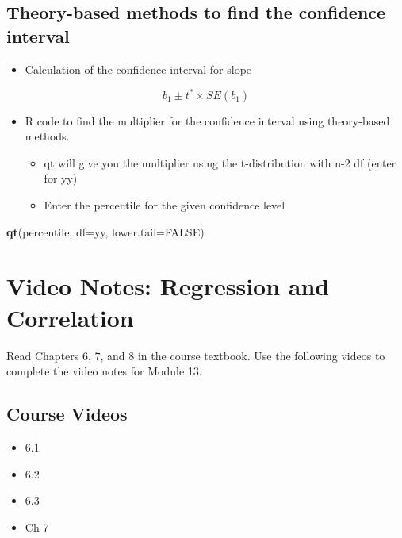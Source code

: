 \documentclass[
]{report}
\newenvironment{Shaded}{\begin{snugshade}}{\end{snugshade}}
\newcommand{\AttributeTok}[1]{\textcolor[rgb]{0.13,0.29,0.53}{#1}}
\newcommand{\ConstantTok}[1]{\textcolor[rgb]{0.56,0.35,0.01}{#1}}
\newcommand{\FunctionTok}[1]{\textcolor[rgb]{0.13,0.29,0.53}{\textbf{#1}}}
\newcommand{\NormalTok}[1]{#1}
\providecommand{\tightlist}{%
  \setlength{\itemsep}{0pt}\setlength{\parskip}{0pt}}
\begin{document}
\subsection*{Theory-based methods to find the confidence interval}\label{theory-based-methods-to-find-the-confidence-interval-1}

\begin{itemize}
\tightlist
\item
  Calculation of the confidence interval for slope
\end{itemize}

\[b_1\pm t^*\times SE(b_1)\]

\begin{itemize}
\item
  R code to find the multiplier for the confidence interval using theory-based methods.

  \begin{itemize}
  \item
    qt will give you the multiplier using the t-distribution with n-2 df (enter for yy)
  \item
    Enter the percentile for the given confidence level
  \end{itemize}
\end{itemize}

\begin{Shaded}
\begin{Highlighting}[]
\FunctionTok{qt}\NormalTok{(percentile, }\AttributeTok{df=}\NormalTok{yy, }\AttributeTok{lower.tail=}\ConstantTok{FALSE}\NormalTok{)}
\end{Highlighting}
\end{Shaded}

\newpage

\section{Video Notes: Regression and Correlation}\label{video-notes-regression-and-correlation}

Read Chapters 6, 7, and 8 in the course textbook. Use the following videos to complete the video notes for Module 13.

\subsection{Course Videos}\label{course-videos-1}

\begin{itemize}
\item
  6.1
\item
  6.2
\item
  6.3
\item
  Ch 7
\end{itemize}
\end{document}

